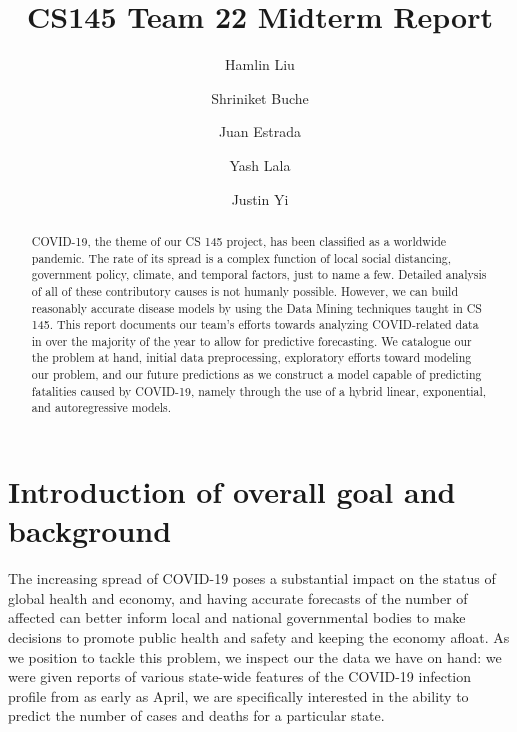 \documentclass[sigconf,nonacm]{acmart}
\begin{document}
\title{CS145 Team 22 Midterm Report}

\author{Hamlin Liu}
\author{Shriniket Buche}
\author{Juan Estrada}
\author{Yash Lala}
\author{Justin Yi}
\renewcommand{\shortauthors}{Team 22}

\begin{abstract}
COVID-19, the theme of our CS 145 project, has been classified as a worldwide pandemic. 
The rate of its spread is a complex function of local social distancing, government policy, 
climate, and temporal factors, just to name a few. Detailed analysis of all of these contributory 
causes is not humanly possible. However, we can build reasonably accurate disease models by using the 
Data Mining techniques taught in CS 145. This report documents our team’s efforts towards analyzing 
COVID-related data in over the majority of the year to allow for predictive forecasting. 
We catalogue our the problem at hand, initial data preprocessing, exploratory efforts toward modeling our problem, 
and our future predictions as we construct a model capable of predicting fatalities caused by COVID-19, 
namely through the use of a hybrid linear, exponential, and autoregressive models. 
\end{abstract}

\maketitle

\section{Introduction of overall goal and background}
The increasing spread of COVID-19 poses a substantial impact on the status of global health and economy, 
and having accurate forecasts of the number of affected can better inform local and national governmental 
bodies to make decisions to promote public health and safety and keeping the economy afloat. 
As we position to tackle this problem, we inspect our the data we have on hand: we were given reports of various 
state-wide features of the COVID-19 infection profile from as early as April, we are specifically interested in the ability 
to predict the number of cases and deaths for a particular state.
\end{document}
